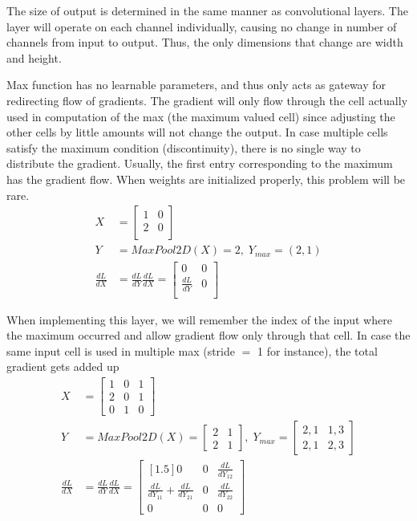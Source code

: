 \documentclass[../../deep_learning_notes.tex]{subfiles}
\begin{document}
The size of output is determined in the same manner as convolutional layers. The layer will operate on each channel individually, causing no change in number of channels from input to output. Thus, the only dimensions that change are width and height.\newline

Max function has no learnable parameters, and thus only acts as gateway for redirecting flow of gradients. The gradient will only flow through the cell actually used in computation of the max (the maximum valued cell) since adjusting the other cells by little amounts will not change the output.\newline
In case multiple cells satisfy the maximum condition (discontinuity), there is no single way to distribute the gradient. Usually, the first entry corresponding to the maximum has the gradient flow. When weights are initialized properly, this problem will be rare.
\begin{align*}
    X &= \begin{bmatrix} 1 &0\\ 2 &0\\\end{bmatrix}\\
    Y &= MaxPool2D(X) = 2, \; Y_{max} = (2,1)\\
    \frac{dL}{dX} &= \frac{dL}{dY}\frac{dL}{dX}
    = \begin{bmatrix} 0 &0\\ \frac{dL}{dY} &0\\\end{bmatrix}
\end{align*}

When implementing this layer, we will remember the index of the input where the maximum occurred and allow gradient flow only through that cell. In case the same input cell is used in multiple max (stride $=$ 1 for instance), the total gradient gets added up
\begin{align*}
    X &= \begin{bmatrix} 1 &0 &1\\ 2 &0 &1\\ 0 &1 &0\end{bmatrix}\\
    Y &= MaxPool2D(X) = \begin{bmatrix} 2 &1\\ 2 &1\end{bmatrix}, \; Y_{max} = \begin{bmatrix} 2,1 &1,3\\ 2,1 &2,3\end{bmatrix}\\
    \frac{dL}{dX} &= \frac{dL}{dY}\frac{dL}{dX}
    = \begin{bmatrix}[1.5] 0 &0 &\frac{dL}{dY_{12}}\\ \frac{dL}{dY_{11}} + \frac{dL}{dY_{21}} &0 &\frac{dL}{dY_{22}}\\ 0 &0 &0\end{bmatrix}
\end{align*}
\end{document}
